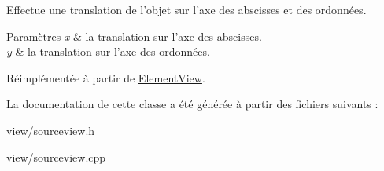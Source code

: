 Effectue une translation de l’objet sur l’axe des abscisses et des ordonnées. 


\begin{DoxyParams}{Paramètres}
{\em x} & la translation sur l’axe des abscisses. \\
\hline
{\em y} & la translation sur l’axe des ordonnées. \\
\hline
\end{DoxyParams}


Réimplémentée à partir de \hyperlink{classElementView_a69a525cb674a36e33be6a8b7a6e4b83c}{Element\+View}.



La documentation de cette classe a été générée à partir des fichiers suivants \+:\begin{DoxyCompactItemize}
\item 
view/sourceview.\+h\item 
view/sourceview.\+cpp\end{DoxyCompactItemize}
